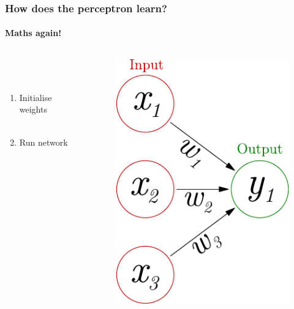 \documentclass{beamer}
\newcommand{\figheight}{0.72\textheight}
\begin{document}
\begin{frame}
\frametitle{How does the perceptron learn?}
\framesubtitle{Maths again!}
  \begin{columns}[T]
    \begin{column}{.45\textwidth} 
    \ \\
    \ \\
\begin{enumerate}

 \item<1-> Initialise weights
 \\ \
 \item<2-> Run network 

%  
%  

 \end{enumerate}

    \end{column}
    \begin{column}{.55\textwidth}
\begin{figure}[t]
 \centering
 \includegraphics[height = \figheight]{./fig/perceptron_maths.pdf}
\end{figure}
    \end{column}
  \end{columns}
\end{frame}
\end{document}
